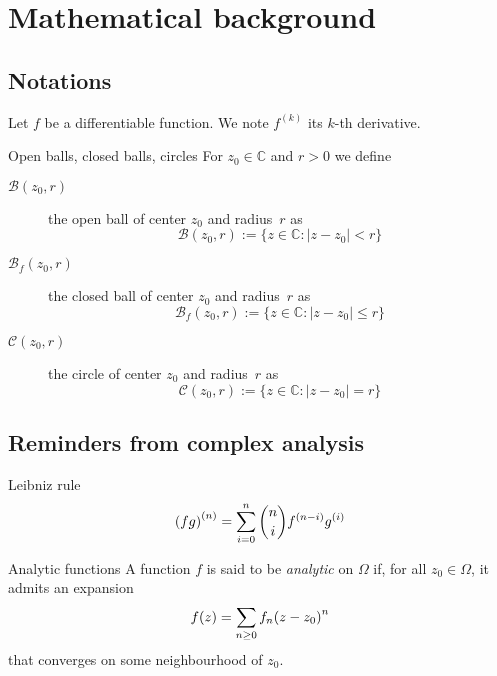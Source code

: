 \documentclass[../main.tex]{subfiles}
\begin{document}
\chapter{Mathematical background}

\section{Notations}

\begin{definition}{}
	Let $f$ be a differentiable function. We note $f^{(k)}$ its $k$-th derivative.
\end{definition}

\begin{definition}{{Open balls, closed balls, circles}}
	For $z_0 \in \mathbb{C}$ and $r > 0$ we define
	\begin{description}
		\item[$\mathcal{B} (z_0, r)$] the open ball of center $z_0$ and radius~$r$ as
		\[
		\mathcal{B} (z_0, r) := \{z \in \mathbb{C} : |z - z_0| < r \}
		\]
		
		\item[$\mathcal{B}_f (z_0, r)$] the closed ball of center $z_0$ and radius~$r$ as
		\[
		\mathcal{B}_f (z_0, r) := \{z \in \mathbb{C} : |z - z_0| \leq r \}
		\]
		
		\item[$\mathcal{C} (z_0, r)$] the circle of center $z_0$ and radius~$r$ as
		\[
		\mathcal{C} (z_0, r) := \{z \in \mathbb{C} : |z - z_0| = r \}
		\]
	\end{description}
\end{definition}

\section{Reminders from complex analysis}


\begin{thm}{Leibniz rule}\label{Leibniz_rule}
	\[
	{(fg)}^{(n)} = \sum\limits_{i=0}^{n} {n \choose i} f^{(n - i)} g^{(i)}
	\]
\end{thm}

\begin{definition}{Analytic functions}
	A function $f$ is said to be \emph{analytic} on $\Omega$ if, for all $z_0 \in \Omega$, it admits an expansion
	\[
	f(z) = \sum\limits_{n \geq 0} f_n {(z - z_0)}^n
	\]
	that converges on some neighbourhood of $z_0$.
\end{definition}
\end{document}
